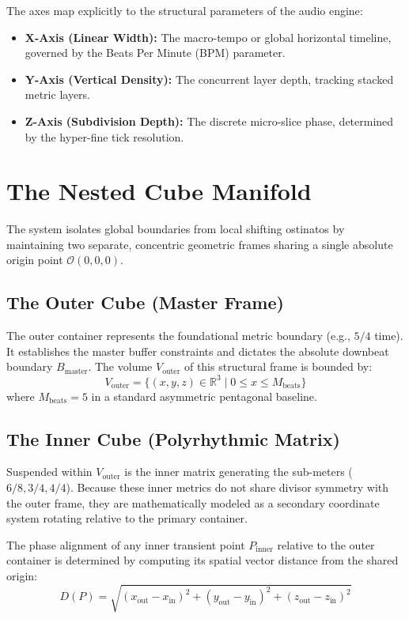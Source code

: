 \documentclass[11pt,twocolumn]{article}
\begin{document}
The axes map explicitly to the structural parameters of the audio engine:
\begin{itemize}
    \item \textbf{X-Axis (Linear Width):} The macro-tempo or global horizontal timeline, governed by the Beats Per Minute (BPM) parameter.
    \item \textbf{Y-Axis (Vertical Density):} The concurrent layer depth, tracking stacked metric layers.
    \item \textbf{Z-Axis (Subdivision Depth):} The discrete micro-slice phase, determined by the hyper-fine tick resolution.
\end{itemize}

\section{The Nested Cube Manifold}
The system isolates global boundaries from local shifting ostinatos by maintaining two separate, concentric geometric frames sharing a single absolute origin point $\mathcal{O}(0,0,0)$.

\subsection{The Outer Cube (Master Frame)}
The outer container represents the foundational metric boundary (e.g., $5/4$ time). It establishes the master buffer constraints and dictates the absolute downbeat boundary $B_{\text{master}}$. The volume $V_{\text{outer}}$ of this structural frame is bounded by:
\begin{equation}
V_{\text{outer}} = \{ (x,y,z) \in \mathbb{R}^3 \mid 0 \le x \le M_{\text{beats}} \}
\end{equation}
where $M_{\text{beats}} = 5$ in a standard asymmetric pentagonal baseline.

\subsection{The Inner Cube (Polyrhythmic Matrix)}
Suspended within $V_{\text{outer}}$ is the inner matrix generating the sub-meters ($6/8, 3/4, 4/4$). Because these inner metrics do not share divisor symmetry with the outer frame, they are mathematically modeled as a secondary coordinate system rotating relative to the primary container.

The phase alignment of any inner transient point $P_{\text{inner}}$ relative to the outer container is determined by computing its spatial vector distance from the shared origin:
\begin{equation}
D(P) = \sqrt{(x_{\text{out}} - x_{\text{in}})^2 + (y_{\text{out}} - y_{\text{in}})^2 + (z_{\text{out}} - z_{\text{in}})^2}
\end{equation}
\end{document}
